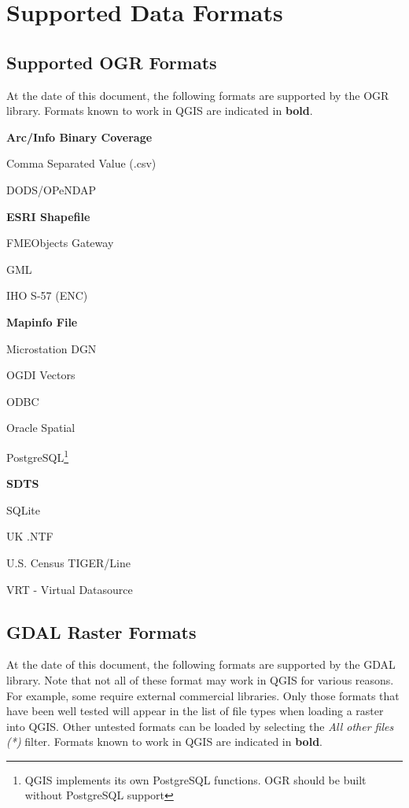 \chapter{Supported Data Formats}\label{appdx_data_formats}
\section{Supported OGR Formats}\label{appdx_ogr} 
At the date of this document, the following formats are supported by the OGR
library. Formats known to work in QGIS are indicated in \textbf{bold}.

\begin{compactitem}
\item \textbf{Arc/Info Binary Coverage}
\item Comma Separated Value (.csv) 
\item DODS/OPeNDAP
\item \textbf{ESRI Shapefile}
\item FMEObjects Gateway
\item GML
\item IHO S-57 (ENC)
\item \textbf{Mapinfo File}
\item Microstation DGN
\item OGDI Vectors
\item ODBC
\item Oracle Spatial
\item PostgreSQL\footnote{QGIS implements its own PostgreSQL functions. OGR should be built without PostgreSQL support}
\item \textbf{SDTS}
\item SQLite
\item UK .NTF
\item U.S. Census TIGER/Line
\item VRT - Virtual Datasource
\end{compactitem}
\section{GDAL Raster Formats}\label{appdx_gdal}
At the date of this document, the following formats are supported by the GDAL
library. Note that not all of these format may work in QGIS for various reasons.
For example, some require external commercial libraries. Only those formats that
have been well tested will appear in the list of file types when loading a
raster into QGIS. Other untested formats can be loaded by selecting the
\textsl{All other files (*)} filter. Formats known to work in QGIS are indicated
in \textbf{bold}.

